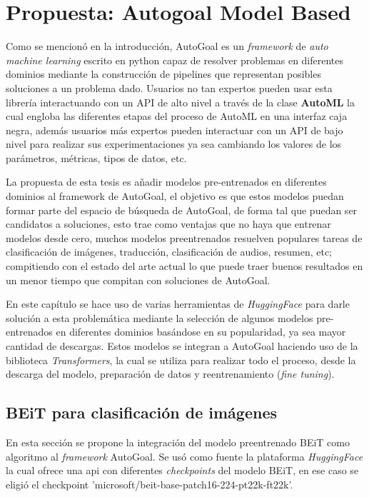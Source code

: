 \chapter{Propuesta: Autogoal Model Based}\label{chapter:proposal}

Como se mencionó en la introducción, AutoGoal es un \textit{framework} de \textit{auto machine learning} escrito en python capaz de resolver problemas en diferentes dominios mediante la construcción de pipelines que representan posibles soluciones a un problema dado. Usuarios no tan expertos pueden usar esta librería interactuando con un API de alto nivel a través de la clase \textbf{AutoML} la cual engloba las diferentes etapas del proceso de AutoML en una interfaz caja negra, además usuarios más expertos pueden interactuar con un API de bajo nivel para realizar sus experimentaciones ya sea cambiando los valores de los parámetros, métricas, tipos de datos, etc.

La propuesta de esta tesis es añadir modelos pre-entrenados en diferentes dominios al framework de AutoGoal, el objetivo es que estos modelos puedan formar parte del espacio de búsqueda de AutoGoal, de forma tal que puedan ser candidatos a soluciones, esto trae como ventajas que no haya que entrenar modelos desde cero, muchos modelos preentrenados resuelven populares tareas de clasificación de imágenes, traducción, clasificación de audios, resumen, etc; compitiendo con el estado del arte actual lo que puede traer buenos resultados en un menor tiempo que compitan con soluciones de AutoGoal.

En este capítulo se hace uso de varias herramientas de \textit{HuggingFace} para darle solución a esta problemática mediante la selección de algunos modelos pre-entrenados en diferentes dominios basándose en su popularidad, ya sea mayor cantidad de descargas. Estos modelos se integran a AutoGoal haciendo uso de la biblioteca \textit{Transformers}, la cual se utiliza para realizar todo el proceso, desde la descarga del modelo, preparación de datos y reentrenamiento (\textit{fine tuning}).

\section{BEiT para clasificación de imágenes}
En esta sección se propone la integración del modelo preentrenado BEiT como algoritmo al \textit{framework} AutoGoal. Se usó como fuente la plataforma \textit{HuggingFace} la cual ofrece una api con diferentes \textit{checkpoints} del modelo BEiT, en ese caso se eligió el checkpoint 'microsoft/beit-base-patch16-224-pt22k-ft22k'.

